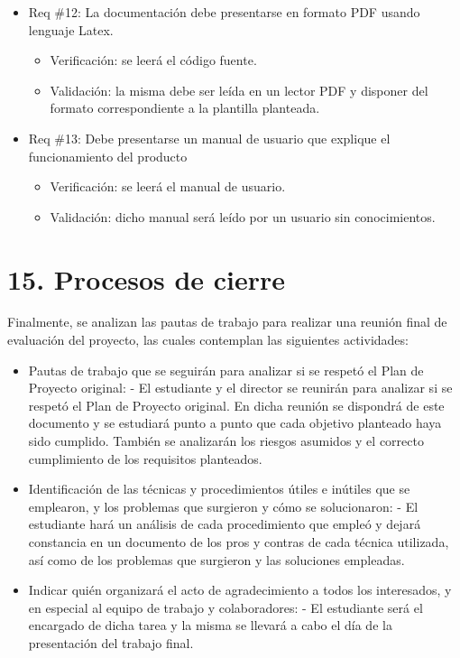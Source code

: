 \documentclass[
11pt, %
]{charter}
\begin{document}
\begin{itemize}
\item Req \#12: La documentación debe presentarse en formato PDF usando lenguaje Latex.
\begin{itemize}
	\item Verificación: se leerá el código fuente.
	\item Validación: la misma debe ser leída en un lector PDF y disponer del formato correspondiente a la plantilla planteada.
\end{itemize}

\item Req \#13: Debe presentarse un manual de usuario que explique el funcionamiento del producto
\begin{itemize}
	\item Verificación: se leerá el manual de usuario.
	\item Validación: dicho manual será leído por un usuario sin conocimientos.
\end{itemize}
\end{itemize}


\section{15. Procesos de cierre}    
\label{sec:cierre}

Finalmente, se analizan las pautas de trabajo para realizar una reunión final de evaluación del proyecto, las cuales contemplan las siguientes actividades:

\begin{itemize}
	\item Pautas de trabajo que se seguirán para analizar si se respetó el Plan de Proyecto original:
	 - El estudiante y el director se reunirán para analizar si se respetó el Plan de Proyecto original. En dicha reunión se dispondrá de este documento y se estudiará punto a punto que cada objetivo planteado haya sido cumplido. También se analizarán los riesgos asumidos y el correcto cumplimiento de los requisitos planteados.
	 
	\item Identificación de las técnicas y procedimientos útiles e inútiles que se emplearon, y los problemas que surgieron y cómo se solucionaron:
	 - El estudiante hará un análisis de cada procedimiento que empleó y dejará constancia en un documento de los pros y contras de cada técnica utilizada, así como de los problemas que surgieron y las soluciones empleadas.
	 
	\item Indicar quién organizará el acto de agradecimiento a todos los interesados, y en especial al equipo de trabajo y colaboradores:
	  - El estudiante será el encargado de dicha tarea y la misma se llevará a cabo el día de la presentación del trabajo final.
\end{itemize}
\end{document}
